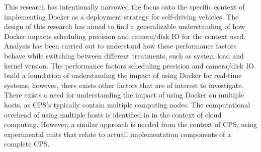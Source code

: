 This research has intentionally narrowed the focus onto the specific context of implementing Docker as a deployment strategy for self-driving vehicles. The design of this research has aimed to find a generalizable understanding of how Docker impacts scheduling precision and camera/disk IO for the context used. Analysis has been carried out to understand how these performance factors behave while switching between different treatments, such as system load and kernel version. The performance factors scheduling precision and camera/disk IO build a foundation of understanding the impact of using Docker for real-time systems, however, there exists other factors that are of interest to investigate. There exists a need for understanding the impact of using Docker on multiple hosts, as CPS's typically contain multiple computing nodes. The computational overhead of using multiple hosts is identified in \cite{p1} in the context of cloud computing. However, a similar approach is needed from the context of CPS, using experimental units that relate to actuall implementation components of a complete CPS.






















